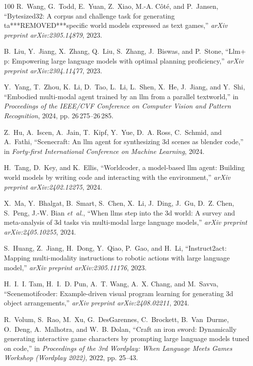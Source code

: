 \documentclass[10pt,journal,compsoc]{IEEEtran}
\begin{document}
\begin{thebibliography}{100}
	R.~Wang, G.~Todd, E.~Yuan, Z.~Xiao, M.-A. C{\^o}t{\'e}, and P.~Jansen,
	``Bytesized32: A corpus and challenge task for generating ta***REMOVED***specific world
	models expressed as text games,'' \emph{arXiv preprint arXiv:2305.14879},
	2023.
	
	B.~Liu, Y.~Jiang, X.~Zhang, Q.~Liu, S.~Zhang, J.~Biswas, and P.~Stone, ``Llm+
	p: Empowering large language models with optimal planning proficiency,''
	\emph{arXiv preprint arXiv:2304.11477}, 2023.
	
	Y.~Yang, T.~Zhou, K.~Li, D.~Tao, L.~Li, L.~Shen, X.~He, J.~Jiang, and Y.~Shi,
	``Embodied multi-modal agent trained by an llm from a parallel textworld,''
	in \emph{Proceedings of the IEEE/CVF Conference on Computer Vision and
		Pattern Recognition}, 2024, pp. 26\,275--26\,285.
	
	Z.~Hu, A.~Iscen, A.~Jain, T.~Kipf, Y.~Yue, D.~A. Ross, C.~Schmid, and A.~Fathi,
	``Scenecraft: An llm agent for synthesizing 3d scenes as blender code,'' in
	\emph{Forty-first International Conference on Machine Learning}, 2024.
	
	H.~Tang, D.~Key, and K.~Ellis, ``Worldcoder, a model-based llm agent: Building
	world models by writing code and interacting with the environment,''
	\emph{arXiv preprint arXiv:2402.12275}, 2024.
	
	X.~Ma, Y.~Bhalgat, B.~Smart, S.~Chen, X.~Li, J.~Ding, J.~Gu, D.~Z. Chen,
	S.~Peng, J.-W. Bian \emph{et~al.}, ``When llms step into the 3d world: A
	survey and meta-analysis of 3d tasks via multi-modal large language models,''
	\emph{arXiv preprint arXiv:2405.10255}, 2024.
	
	S.~Huang, Z.~Jiang, H.~Dong, Y.~Qiao, P.~Gao, and H.~Li, ``Instruct2act:
	Mapping multi-modality instructions to robotic actions with large language
	model,'' \emph{arXiv preprint arXiv:2305.11176}, 2023.
	
	H.~I.~I. Tam, H.~I.~D. Pun, A.~T. Wang, A.~X. Chang, and M.~Savva,
	``Scenemotifcoder: Example-driven visual program learning for generating 3d
	object arrangements,'' \emph{arXiv preprint arXiv:2408.02211}, 2024.
	
	R.~Volum, S.~Rao, M.~Xu, G.~DesGarennes, C.~Brockett, B.~Van~Durme, O.~Deng,
	A.~Malhotra, and W.~B. Dolan, ``Craft an iron sword: Dynamically generating
	interactive game characters by prompting large language models tuned on
	code,'' in \emph{Proceedings of the 3rd Wordplay: When Language Meets Games
		Workshop (Wordplay 2022)}, 2022, pp. 25--43.
	

\end{thebibliography}
\end{document}

